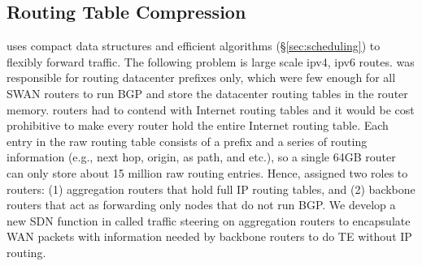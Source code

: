 \subsection{Routing Table Compression}
{\sys} uses compact data structures and efficient algorithms (\S \ref{sec:scheduling}) to flexibly forward traffic. The following problem is large scale ipv4, ipv6 routes. {\sys} was responsible for routing datacenter prefixes only, which were few enough for all SWAN routers to run BGP and store the datacenter routing tables in the router memory. {\sys} routers had to contend with Internet routing tables and it would be cost prohibitive to make every {\sys} router hold the entire Internet routing table.  Each entry in the raw routing table consists of a prefix and a series of routing information (e.g., next hop, origin, as path, and etc.), so a single 64GB router can only store about 15 million raw routing entries. Hence, {\sys} assigned two roles to routers: (1) aggregation routers that hold full IP routing tables, and (2) backbone routers that act as forwarding only nodes that do not run BGP. We develop a new SDN function in {\sys} called traffic steering on aggregation routers to encapsulate WAN packets with information needed by backbone routers to do TE without IP routing. 


